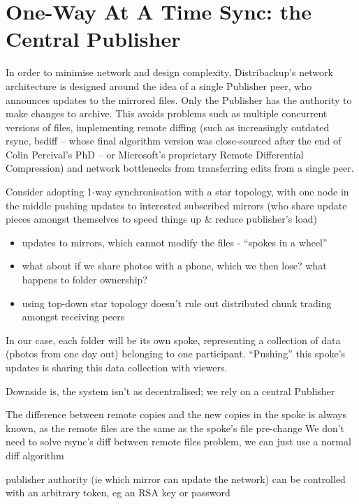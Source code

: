 \documentclass[12pt,a4paper,]{adreport}
\begin{document}
\section{One-Way At A Time Sync: the Central
Publisher}\label{one-way-at-a-time-sync-the-central-publisher}

In order to minimise network and design complexity, Distribackup's
network architecture is designed around the idea of a single Publisher
peer, who announces updates to the mirrored files. Only the Publisher
has the authority to make changes to archive. This avoids problems such
as multiple concurrent versions of files, implementing remote diffing
(such as increasingly outdated rsync, bsdiff -- whose final algorithm
version was close-sourced after the end of Colin Percival's PhD -- or
Microsoft's proprietary Remote Differential Compression) and network
bottlenecks from transferring edits from a single peer.

Consider adopting 1-way synchronisation with a star topology, with one
node in the middle pushing updates to interested subscribed mirrors (who
share update pieces amongst themselves to speed things up \& reduce
publisher's load)

\begin{itemize}
\itemsep1pt\parskip0pt
\item
  updates to mirrors, which cannot modify the files - ``spokes in a
  wheel''
\item
  what about if we share photos with a phone, which we then lose? what
  happens to folder ownership?
\item
  using top-down star topology doesn't rule out distributed chunk
  trading amongst receiving peers
\end{itemize}

In our case, each folder will be its own spoke, representing a
collection of data (photos from one day out) belonging to one
participant. ``Pushing'' this spoke's updates is sharing this data
collection with viewers.

Downside is, the system isn't as decentralised; we rely on a central
Publisher

The difference between remote copies and the new copies in the spoke is
always known, as the remote files are the same as the spoke's file
pre-change We don't need to solve rsync's diff between remote files
problem, we can just use a normal diff algorithm

publisher authority (ie which mirror can update the network) can be
controlled with an arbitrary token, eg an RSA key or password
\end{document}

